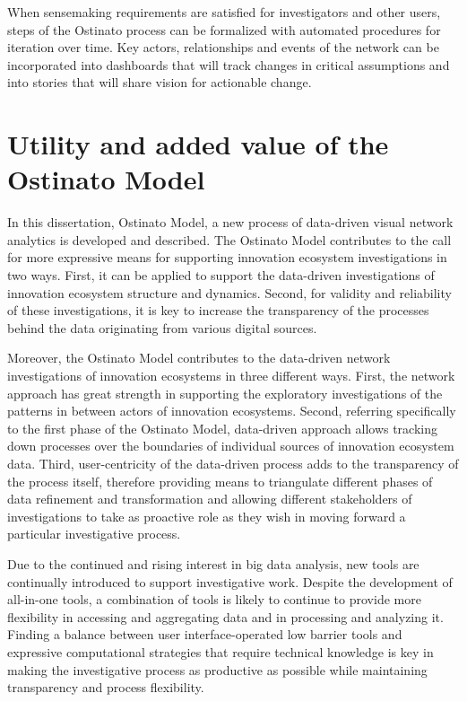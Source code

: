 When sensemaking requirements are satisfied for investigators and other users, steps of the Ostinato process can be formalized with automated procedures for iteration over time. Key actors, relationships and events of the network can be incorporated into dashboards that will track changes in critical assumptions and into stories that will share vision for actionable change.

\section{Utility and added value of the Ostinato Model}

In this dissertation, Ostinato Model, a new process of data-driven visual network analytics is developed and described. The Ostinato Model contributes to the call for more expressive means for supporting innovation ecosystem investigations in two ways. First, it can be applied to support the data-driven investigations of innovation ecosystem structure and dynamics. Second, for validity and reliability of these investigations, it is key to increase the transparency of the processes behind the data originating from various digital sources.

Moreover, the Ostinato Model contributes to the data-driven network investigations of innovation ecosystems in three different ways. First, the network approach has great strength in supporting the exploratory investigations of the patterns in between actors of innovation ecosystems. Second, referring specifically to the first phase of the Ostinato Model, data-driven approach allows tracking down processes over the boundaries of individual sources of innovation ecosystem data. Third, user-centricity of the data-driven process adds to the transparency of the process itself, therefore providing means to triangulate different phases of data refinement and transformation and allowing different stakeholders of investigations to take as proactive role as they wish in moving forward a particular investigative process.

Due to the continued and rising interest in big data analysis, new tools are continually introduced to support investigative work. Despite the development of all-in-one tools, a combination of tools is likely to continue to provide more flexibility in accessing and aggregating data and in processing and analyzing it. Finding a balance between user interface-operated low barrier tools and expressive computational strategies that require technical knowledge is key in making the investigative process as productive as possible while maintaining transparency and process flexibility.

